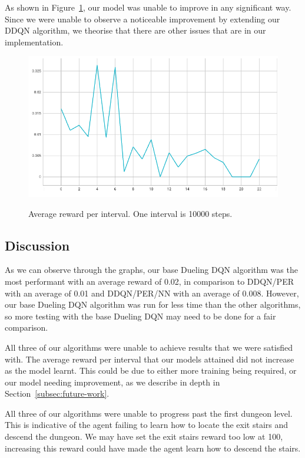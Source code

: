 \documentclass[12pt,a4paper]{article}
\begin{document}
    As shown in Figure~\ref{fig:ddqn_noisy_interval_score}, our model was unable to improve in any significant way.
    Since we were unable to observe a noticeable improvement by extending our DDQN algorithm, we theorise that
    there are other issues that are in our implementation.
    \begin{figure}[H]
        \caption[DDQN/PER/NN: Average reward per interval.]{Average reward per interval. One interval is 10000 steps.}
        \centering
        \includegraphics[scale=0.5]{interval_score_ddqn_noisy}
        \label{fig:ddqn_noisy_interval_score}
    \end{figure}

    \subsection{Discussion}\label{subsec:discussion}
    As we can observe through the graphs, our base Dueling DQN algorithm was the most performant with an average reward of
    0.02, in comparison to DDQN/PER with an average of 0.01 and DDQN/PER/NN with an average of 0.008.
    However, our base Dueling DQN algorithm was run for less time than the other algorithms, so more testing with the
    base Dueling DQN may need to be done for a fair comparison.

    All three of our algorithms were unable to achieve results that we were satisfied with.
    The average reward per interval that our models attained did not increase as the model learnt.
    This could be due to either more training being required, or our model needing improvement, as we describe in depth in Section~\ref{subsec:future-work}.

    All three of our algorithms were unable to progress past the first dungeon level.
    This is indicative of the agent failing to learn how to locate the exit stairs and descend the dungeon.
    We may have set the exit stairs reward too low at 100, increasing this reward could have made the agent learn how
    to descend the stairs.
\end{document}
